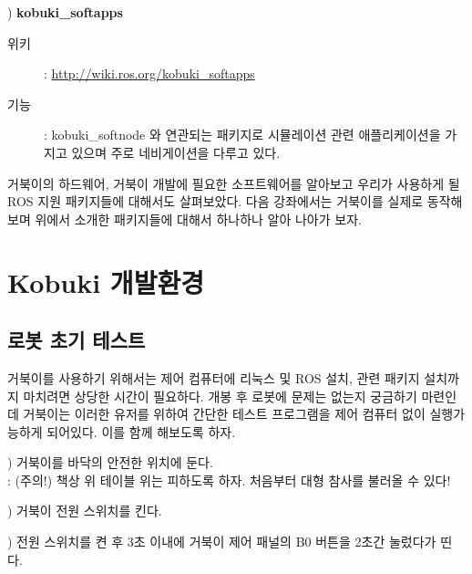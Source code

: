 \vspace{\baselineskip}
\noindent{}
\thenum) \textbf{kobuki\_softapps}
\begin{description}
\item[위키]: \url{http://wiki.ros.org/kobuki_softapps}
\item[기능]: kobuki\_softnode 와 연관되는 패키지로 시뮬레이션 관련 애플리케이션을 가지고 있으며 주로 네비게이션을 다루고 있다.
\end{description}

\vspace{\baselineskip}
\noindent
거북이의 하드웨어, 거북이 개발에 필요한 소프트웨어를 알아보고 우리가 사용하게 될 ROS 지원 패키지들에 대해서도 살펴보았다. 다음 강좌에서는 거북이를 실제로 동작해보며 위에서 소개한 패키지들에 대해서 하나하나 알아 나아가 보자.

\section{Kobuki 개발환경}

\subsection{로봇 초기 테스트}

거북이를 사용하기 위해서는 제어 컴퓨터에 리눅스 및 ROS 설치, 관련 패키지 설치까지 마치려면 상당한 시간이 필요하다. 개봉 후 로봇에 문제는 없는지 궁금하기 마련인데 거북이는 이러한 유저를 위하여 간단한 테스트 프로그램을 제어 컴퓨터 없이 실행가능하게 되어있다. 이를 함께 해보도록 하자. 

\setcounter{num}{0}

\vspace{\baselineskip}
\noindent{}
\thenum) 거북이를 바닥의 안전한 위치에 둔다.\\
: (주의!) 책상 위 테이블 위는 피하도록 하자. 처음부터 대형 참사를 불러올 수 있다!

\vspace{\baselineskip}
\noindent{}
\thenum) 거북이 전원 스위치를 킨다. 

\vspace{\baselineskip}
\noindent{}
\thenum) 전원 스위치를 켠 후 3초 이내에 거북이 제어 패널의 B0 버튼을 2초간 눌렀다가 띤다.


